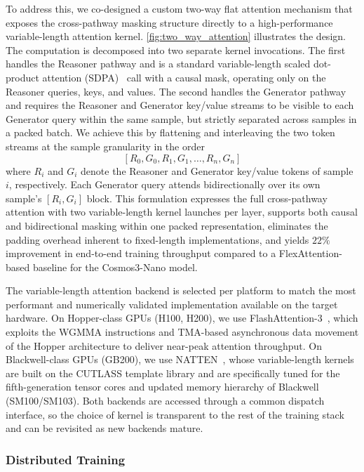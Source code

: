 To address this, we co-designed a custom two-way flat attention mechanism that exposes the cross-pathway masking structure directly to a high-performance variable-length attention kernel. \cref{fig:two_way_attention} illustrates the design. The computation is decomposed into two separate kernel invocations. The first handles the Reasoner pathway and is a standard variable-length scaled dot-product attention (SDPA)~\citep{pytorch_varlen_attn} call with a causal mask, operating only on the Reasoner queries, keys, and values. The second handles the Generator pathway and requires the Reasoner and Generator key/value streams to be visible to each Generator query within the same sample, but strictly separated across samples in a packed batch. We achieve this by flattening and interleaving the two token streams at the sample granularity in the order
\[
[R_0, G_0, R_1, G_1, \ldots, R_n, G_n]
\]
where $R_i$ and $G_i$ denote the Reasoner and Generator key/value tokens of sample $i$, respectively. Each Generator query attends bidirectionally over its own sample's $[R_i, G_i]$ block. This formulation expresses the full cross-pathway attention with two variable-length kernel launches per layer, supports both causal and bidirectional masking within one packed representation, eliminates the padding overhead inherent to fixed-length implementations, and yields $22\%$ improvement in end-to-end training throughput compared to a FlexAttention-based baseline for the Cosmos3-Nano model.



The variable-length attention backend is selected per platform to match the most performant and numerically validated implementation available on the target hardware. On Hopper-class GPUs (H100, H200), we use FlashAttention-3~\citep{flash3}, which exploits the WGMMA instructions and TMA-based asynchronous data movement of the Hopper architecture to deliver near-peak attention throughput. On Blackwell-class GPUs (GB200), we use NATTEN~\citep{natten}, whose variable-length kernels are built on the CUTLASS template library and are specifically tuned for the fifth-generation tensor cores and updated memory hierarchy of Blackwell (SM100/SM103). Both backends are accessed through a common dispatch interface, so the choice of kernel is transparent to the rest of the training stack and can be revisited as new backends mature.

\subsubsection{Distributed Training}

